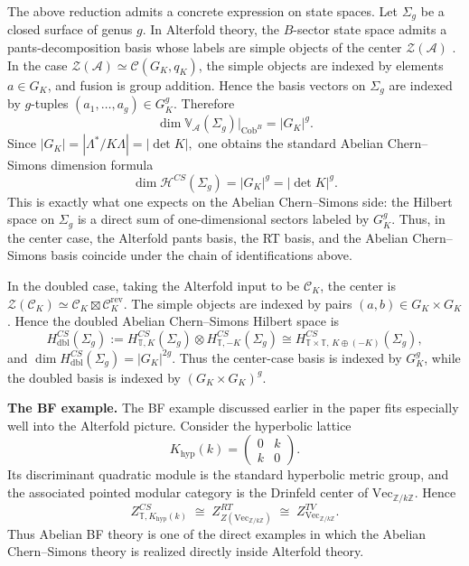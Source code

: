 \documentclass[12pt]{amsart}
\numberwithin{equation}{section}
\theoremstyle{definition}
\begin{document}
The above reduction admits a concrete expression on state spaces. Let $\Sigma_g$ be a closed surface of genus $g$. In Alterfold theory, the $B$-sector state space admits a pants-decomposition basis whose labels are simple objects of the center $\mathcal Z(\mathcal A)$ \cite[Section~4]{Alterfold1}. In the case $\mathcal Z(\mathcal A)\simeq \mathcal C(G_K,q_K)$, the simple objects are indexed by elements $a\in G_K$, and fusion is group addition. Hence the basis vectors on $\Sigma_g$ are indexed by $g$-tuples $(a_1,\dots,a_g)\in G_K^g.$ Therefore
$$
\dim \mathbb V_{\mathcal A}(\Sigma_g)\big|_{\mathrm{Cob}^B} = |G_K|^g.
$$
Since $|G_K|=|\Lambda^*/K\Lambda|=|\det K|,$ one obtains the standard Abelian Chern--Simons dimension formula
$$
\dim \mathcal H^{CS}(\Sigma_g)=|G_K|^g=|\det K|^g.
$$
This is exactly what one expects on the Abelian Chern--Simons side: the Hilbert space on $\Sigma_g$ is a direct sum of one-dimensional sectors labeled by $G_K^g$. Thus, in the center case, the Alterfold pants basis, the RT basis, and the Abelian Chern--Simons basis coincide under the chain of identifications above.

In the doubled case, taking the Alterfold input to be $\mathcal C_K$, the center is $\mathcal Z(\mathcal C_K)\simeq \mathcal C_K\boxtimes \mathcal C_K^{\mathrm{rev}}.$ The simple objects are indexed by pairs $(a,b)\in G_K\times G_K$. Hence the doubled Abelian Chern--Simons Hilbert space is
$$
H^{CS}_{\mathrm{dbl}}(\Sigma_g)
:=
H^{CS}_{\mathbb T,K}(\Sigma_g)\otimes
H^{CS}_{\mathbb T,-K}(\Sigma_g)
\cong
H^{CS}_{\mathbb T\times\mathbb T,\,K\oplus(-K)}(\Sigma_g),
$$
and $\dim H^{CS}_{\mathrm{dbl}}(\Sigma_g)=|G_K|^{2g}.$ Thus the center-case basis is indexed by $G_K^g$, while the doubled basis is indexed by $(G_K\times G_K)^g$.


\textbf{The BF example.} The BF example discussed earlier in the paper fits especially well into the Alterfold picture. Consider the hyperbolic lattice
$$
K_{\mathrm{hyp}}(k)=
\begin{pmatrix}
0 & k\\
k & 0
\end{pmatrix}.
$$
Its discriminant quadratic module is the standard hyperbolic metric group, and the
associated pointed modular category is the Drinfeld center of
$\mathrm{Vec}_{\mathbb Z/k\mathbb Z}$. Hence
$$
Z^{CS}_{\mathbb T,K_{\mathrm{hyp}}(k)}
\;\cong\;
Z^{RT}_{Z(\mathrm{Vec}_{\mathbb Z/k\mathbb Z})}
\;\cong\;
Z^{TV}_{\mathrm{Vec}_{\mathbb Z/k\mathbb Z}}.
$$
Thus Abelian BF theory is one of the direct examples in which the Abelian Chern--Simons theory is realized directly inside Alterfold theory.
\end{document}
